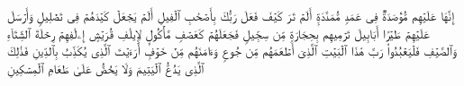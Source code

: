 إِنَّهَا عَلَیۡهِم مُّؤۡصَدَةࣱ%
\stopbuffer%
\startbuffer[\q:104:9]
فِی عَمَدࣲ مُّمَدَّدَةِۭ%
\stopbuffer%
\startbuffer[\q:105:1]
أَلَمۡ تَرَ كَیۡفَ فَعَلَ رَبُّكَ بِأَصۡحَٰبِ ٱلۡفِیلِ%
\stopbuffer%
\startbuffer[\q:105:2]
أَلَمۡ یَجۡعَلۡ كَیۡدَهُمۡ فِی تَضۡلِیلࣲ%
\stopbuffer%
\startbuffer[\q:105:3]
وَأَرۡسَلَ عَلَیۡهِمۡ طَیۡرًا أَبَابِیلَ%
\stopbuffer%
\startbuffer[\q:105:4]
تَرۡمِیهِم بِحِجَارَةࣲ مِّن سِجِّیلࣲ%
\stopbuffer%
\startbuffer[\q:105:5]
فَجَعَلَهُمۡ كَعَصۡفࣲ مَّأۡكُولِۭ%
\stopbuffer%
\startbuffer[\q:106:1]
لِإِیلَٰفِ قُرَیۡشٍ%
\stopbuffer%
\startbuffer[\q:106:2]
إِۦلَٰفِهِمۡ رِحۡلَةَ ٱلشِّتَاۤءِ وَٱلصَّیۡفِ%
\stopbuffer%
\startbuffer[\q:106:3]
فَلۡیَعۡبُدُوا۟ رَبَّ هَٰذَا ٱلۡبَیۡتِ%
\stopbuffer%
\startbuffer[\q:106:4]
ٱلَّذِیۤ أَطۡعَمَهُم مِّن جُوعࣲ وَءَامَنَهُم مِّنۡ خَوۡفِۭ%
\stopbuffer%
\startbuffer[\q:107:1]
أَرَءَیۡتَ ٱلَّذِی یُكَذِّبُ بِٱلدِّینِ%
\stopbuffer%
\startbuffer[\q:107:2]
فَذَٰلِكَ ٱلَّذِی یَدُعُّ ٱلۡیَتِیمَ%
\stopbuffer%
\startbuffer[\q:107:3]
وَلَا یَحُضُّ عَلَىٰ طَعَامِ ٱلۡمِسۡكِینِ%
\stopbuffer%

